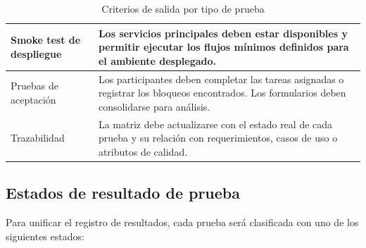 \documentclass[12pt,letterpaper]{article}
\begin{document}
\begin{table}[H]
\begin{tabularx}{\textwidth}{|
>{\raggedright\arraybackslash}p{3.7cm}|
>{\raggedright\arraybackslash}X|}
Smoke test de despliegue &
Los servicios principales deben estar disponibles y permitir ejecutar los flujos mínimos definidos para el ambiente desplegado. \\
\hline

Pruebas de aceptación &
Los participantes deben completar las tareas asignadas o registrar los bloqueos encontrados. Los formularios deben consolidarse para análisis. \\
\hline

Trazabilidad &
La matriz debe actualizarse con el estado real de cada prueba y su relación con requerimientos, casos de uso o atributos de calidad. \\
\hline

\end{tabularx}

\endgroup
\caption{Criterios de salida por tipo de prueba}
\label{tab:criterios-salida-tipo-prueba}
\end{table}

\subsection{Estados de resultado de prueba}

Para unificar el registro de resultados, cada prueba será clasificada con uno de los siguientes estados:
\end{document}
